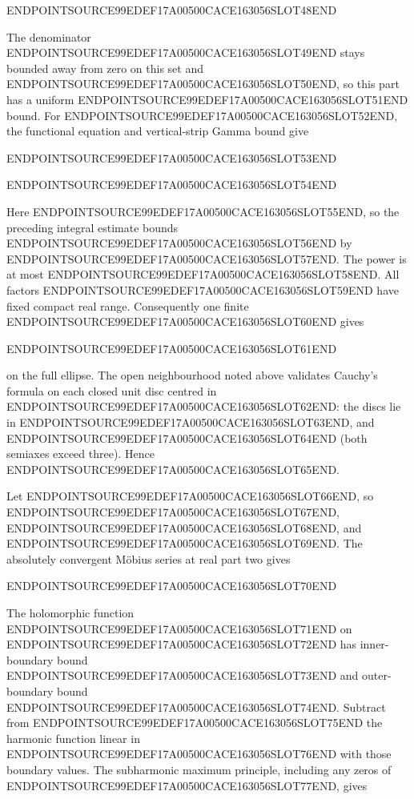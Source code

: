 ENDPOINTSOURCE99EDEF17A00500CACE163056SLOT48END

The denominator ENDPOINTSOURCE99EDEF17A00500CACE163056SLOT49END stays bounded away from zero on this set and ENDPOINTSOURCE99EDEF17A00500CACE163056SLOT50END, so this part has a uniform ENDPOINTSOURCE99EDEF17A00500CACE163056SLOT51END bound. For ENDPOINTSOURCE99EDEF17A00500CACE163056SLOT52END, the functional equation and vertical-strip Gamma bound give

ENDPOINTSOURCE99EDEF17A00500CACE163056SLOT53END

ENDPOINTSOURCE99EDEF17A00500CACE163056SLOT54END

Here ENDPOINTSOURCE99EDEF17A00500CACE163056SLOT55END, so the preceding integral estimate bounds ENDPOINTSOURCE99EDEF17A00500CACE163056SLOT56END by ENDPOINTSOURCE99EDEF17A00500CACE163056SLOT57END. The power is at most ENDPOINTSOURCE99EDEF17A00500CACE163056SLOT58END. All factors ENDPOINTSOURCE99EDEF17A00500CACE163056SLOT59END have fixed compact real range. Consequently one finite ENDPOINTSOURCE99EDEF17A00500CACE163056SLOT60END gives

ENDPOINTSOURCE99EDEF17A00500CACE163056SLOT61END

on the full ellipse. The open neighbourhood noted above validates Cauchy's formula on each closed unit disc centred in ENDPOINTSOURCE99EDEF17A00500CACE163056SLOT62END: the discs lie in ENDPOINTSOURCE99EDEF17A00500CACE163056SLOT63END, and ENDPOINTSOURCE99EDEF17A00500CACE163056SLOT64END (both semiaxes exceed three). Hence ENDPOINTSOURCE99EDEF17A00500CACE163056SLOT65END.

Let ENDPOINTSOURCE99EDEF17A00500CACE163056SLOT66END, so ENDPOINTSOURCE99EDEF17A00500CACE163056SLOT67END, ENDPOINTSOURCE99EDEF17A00500CACE163056SLOT68END, and ENDPOINTSOURCE99EDEF17A00500CACE163056SLOT69END. The absolutely convergent Möbius series at real part two gives

ENDPOINTSOURCE99EDEF17A00500CACE163056SLOT70END

The holomorphic function ENDPOINTSOURCE99EDEF17A00500CACE163056SLOT71END on ENDPOINTSOURCE99EDEF17A00500CACE163056SLOT72END has inner-boundary bound ENDPOINTSOURCE99EDEF17A00500CACE163056SLOT73END and outer-boundary bound ENDPOINTSOURCE99EDEF17A00500CACE163056SLOT74END. Subtract from ENDPOINTSOURCE99EDEF17A00500CACE163056SLOT75END the harmonic function linear in ENDPOINTSOURCE99EDEF17A00500CACE163056SLOT76END with those boundary values. The subharmonic maximum principle, including any zeros of ENDPOINTSOURCE99EDEF17A00500CACE163056SLOT77END, gives


